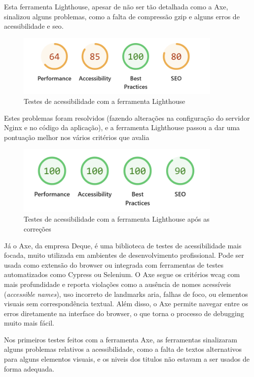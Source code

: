 Esta ferramenta Lighthouse, apesar de não ser tão detalhada como a Axe, sinalizou alguns problemas, como a falta de compressão \gls{gzip} e alguns erros de acessibilidade e \gls{seo}. 

\begin{figure}[H]
\centering
\includegraphics[max width=10cm]{./img/lh_before}
\caption{Testes de acessibilidade com a ferramenta Lighthouse}
\end{figure}

Estes problemas foram resolvidos (fazendo alterações na configuração do servidor Nginx e no código da aplicação), e a ferramenta Lighthouse passou a dar uma pontuação melhor nos vários critérios que avalia

\begin{figure}[H]
\centering
\includegraphics[max width=10cm]{./img/lh_after}
\caption{Testes de acessibilidade com a ferramenta Lighthouse após as correções}
\end{figure}

Já o Axe, da empresa Deque, é uma biblioteca de testes de acessibilidade mais focada, muito utilizada em ambientes de desenvolvimento profissional. Pode ser usada como extensão do browser ou integrada com ferramentas de testes automatizados como Cypress ou Selenium. O Axe segue os critérios \gls{wcag} com mais profundidade e reporta violações como a ausência de nomes acessíveis (\textit{accessible names}), uso incorreto de landmarks \gls{aria}, falhas de foco, ou elementos visuais sem correspondência textual. Além disso, o Axe permite navegar entre os erros diretamente na interface do browser, o que torna o processo de debugging muito mais fácil.

Nos primeiros testes feitos com a ferramenta Axe, as ferramentas sinalizaram alguns problemas relativos a acessibilidade, como a falta de textos alternativos para alguns elementos visuais, e os niveis dos titulos não estavam a ser usados de forma adequada.

